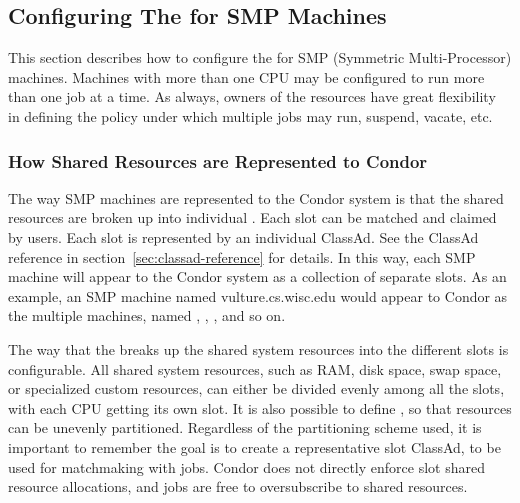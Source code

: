 \subsection{\label{sec:Configuring-SMP}
Configuring The  for SMP Machines}

This section describes how to configure the  for SMP
(Symmetric Multi-Processor) machines.
Machines with more than one CPU may
be configured to run more than one job at a time.
As always, owners of the resources have great flexibility in defining
the policy under which multiple jobs may run, suspend, vacate, etc.  

\subsubsection{\label{sec:How-Resources-Represented}
How Shared Resources are Represented to Condor}

The way SMP machines are represented to the Condor system is that
the shared resources are broken up into individual .
Each slot can be matched and claimed by users.
Each slot is represented by an individual ClassAd.
See the ClassAd reference in section~\ref{sec:classad-reference} for details. 
In this way, each SMP machine will appear to the Condor system as
a collection of separate slots.
As an example, an SMP machine named
vulture.cs.wisc.edu would appear to Condor as the
multiple machines, named ,
,
, and so on.

The way that the  breaks up the
shared system resources into the different slots
is configurable.
All shared system resources,
such as RAM, disk space, swap space, or specialized custom resources,
can either be divided evenly among all the slots, 
with each CPU getting its own slot.
It is also possible to define ,
so that resources can be unevenly partitioned.  
Regardless of the partitioning scheme used, it is important
to remember the goal is to create a representative slot
ClassAd, to be used for matchmaking with jobs.  Condor does not
directly enforce slot shared resource allocations, and jobs
are free to oversubscribe to shared resources.

